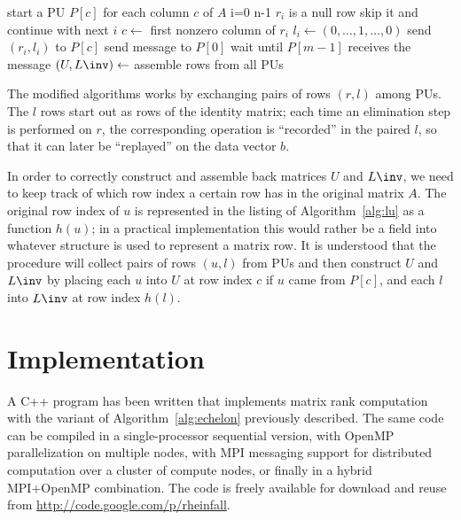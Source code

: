 \begin{Algorithm}
\begin{codebox}
    \li start a PU $P[c]$ for each column $c$ of $A$  \label{li:lumaster:start}
    \li \For i=0 \To n-1                              \label{li:lumaster:read1}
    \li \Do
    \li   \If $r_i$ is a null row 
    \li   \Then
            skip it and continue with next $i$
          \End %
    \li   $c \gets$ first nonzero column of $r_i$
    \li   $l_i \gets (0, \ldots, 1, \ldots, 0)$
    \li   send $(r_i, l_i)$ to $P[c]$                    \label{li:lumaster:read2}
        \End %
    \li send  message to $P[0]$            \label{li:lumaster:core1}
    \li wait until $P[m-1]$ receives the  message
                                                      \label{li:lumaster:core2}
    \li $(U, L\inv) \gets$ assemble  rows from all PUs
                                                      \label{li:lumaster:result}
    \li \Return {}                           \label{li:lumaster:end}
  \end{codebox}
\end{Algorithm}

The modified algorithms works by exchanging pairs of rows $(r,l)$
among PUs.  The $l$ rows start out as rows of the identity matrix;
each time an elimination step is performed on $r$, the corresponding
operation is ``recorded'' in the paired $l$, so that it can later be
``replayed'' on the data vector $b$.

In order to correctly construct and assemble back matrices $U$ and
$L\inv$, we need to keep track of which row index a certain row has in
the original matrix $A$.  The original row index of $u$ is represented
in the listing of Algorithm~\ref{alg:lu} as a function $h(u)$; in a
practical implementation this would rather be a field into whatever
structure is used to represent a matrix row. It is understood that
the  procedure will collect pairs of rows $(u,l)$
from PUs and then construct $U$ and $L\inv$ by placing each $u$ into
$U$ at row index $c$ if $u$ came from $P[c]$,  and each $l$ into
$L\inv$ at row index $h(l)$.


\section{Implementation}
\label{sec:impl}

A C++ program has been written that implements matrix rank computation
with the variant of Algorithm~\ref{alg:echelon} previously described.
The same code can be compiled in a single-processor sequential
version, with OpenMP parallelization on multiple nodes, with MPI
messaging support for distributed computation over a cluster of
compute nodes, or finally in a hybrid MPI+OpenMP combination.  The
code is freely available for download and reuse from
\url{http://code.google.com/p/rheinfall}.

